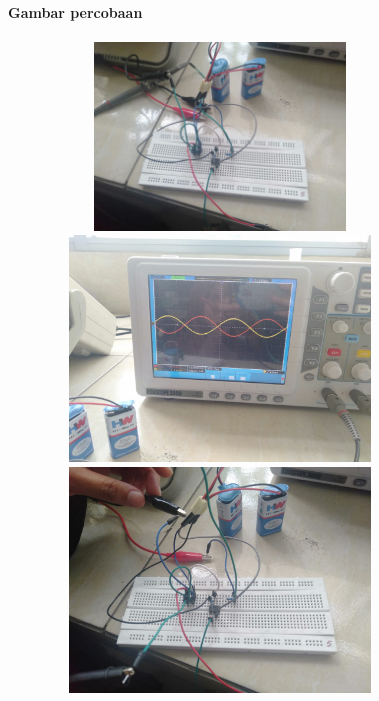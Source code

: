 \documentclass[12pt,a4paper]{article}
\begin{document}
\newpage
\begin{figure}
\paragraph{Gambar percobaan}
\paragraph{ }
\begin{center}

\includegraphics[width=12cm, height=5cm]{inverting1.png}

\includegraphics[width=12cm, height=6cm]{inverting2.png}

\includegraphics[width=12cm, height=6cm]{inverting3.png}
\end{center}
\end{figure}
\vspace{2cm}
\end{document}

